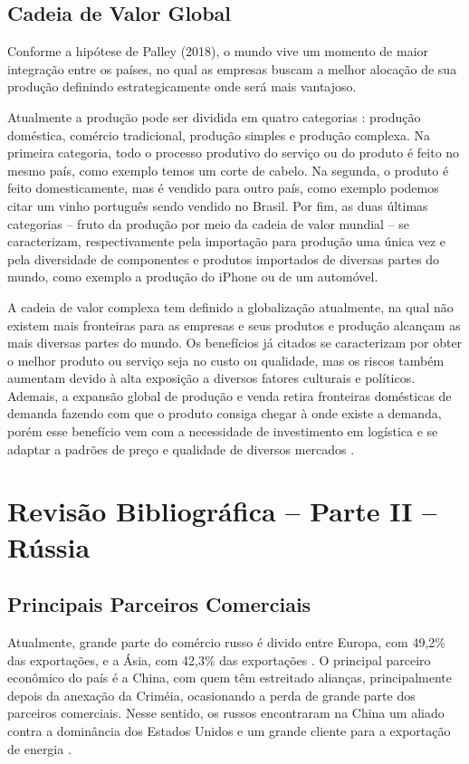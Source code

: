 \documentclass[12pt]{article}
\begin{document}
\subsection{Cadeia de Valor Global}

Conforme a hipótese de Palley (2018), o mundo vive um momento de maior integração entre os países, no qual as empresas buscam a melhor alocação de sua produção definindo estrategicamente onde será mais vantajoso. 

Atualmente a produção pode ser dividida em quatro categorias \cite{wang2017measures}: produção doméstica, comércio tradicional, produção simples e produção complexa. Na primeira categoria, todo o processo produtivo do serviço ou do produto é feito no mesmo país, como exemplo temos um corte de cabelo. Na segunda, o produto é feito domesticamente, mas é vendido para outro país, como exemplo podemos citar um vinho português sendo vendido no Brasil. Por fim, as duas últimas categorias – fruto da produção por meio da cadeia de valor mundial – se caracterizam, respectivamente pela importação para produção uma única vez e pela diversidade de componentes e produtos importados de diversas partes do mundo, como exemplo a produção do iPhone ou de um automóvel.

A cadeia de valor complexa tem definido a globalização atualmente, na qual não existem mais fronteiras para as empresas e seus produtos e produção alcançam as mais diversas partes do mundo. Os benefícios já citados se caracterizam por obter o melhor produto ou serviço seja no custo ou qualidade, mas os riscos também aumentam devido à alta exposição a diversos fatores culturais e políticos. Ademais, a expansão global de produção e venda retira fronteiras domésticas de demanda fazendo com que o produto consiga chegar à onde existe a demanda, porém esse benefício vem com a necessidade de investimento em logística e se adaptar a padrões de preço e qualidade de diversos mercados \cite{riskOpportunities14}.
\pagebreak

\section{Revisão Bibliográfica – Parte II – Rússia}

\subsection{Principais Parceiros Comerciais}
Atualmente, grande parte do comércio russo é divido entre Europa, com 49,2\% das exportações, e a Ásia, com 42,3\% das exportações \cite{oecRussia22}. O principal parceiro econômico do país é a China, com quem têm estreitado alianças, principalmente depois da anexação da Criméia, ocasionando a perda de grande parte dos parceiros comerciais. Nesse sentido, os russos encontraram na China um aliado contra a dominância dos Estados Unidos e um grande cliente para a exportação de energia \cite{bloombergChinaRussia22}. 
\end{document}
